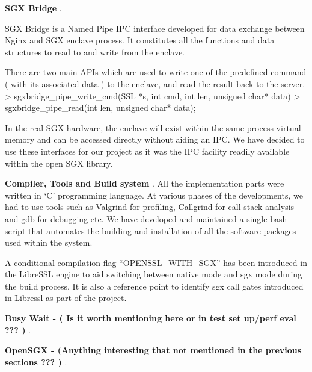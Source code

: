 \documentclass[../main.tex]{subfiles}
\begin{document}
\textbf{SGX Bridge }.

SGX Bridge is a Named Pipe IPC interface developed for data exchange between Nginx and SGX enclave process. It constitutes all the functions and data structures to read to and write from the enclave. 

There are two main APIs which are used to write one of the predefined command ( with its  associated data ) to the enclave, and read the result back to the server. 
> sgxbridge\_pipe\_write\_cmd(SSL *s, int cmd, int len, unsigned char* data)
> sgxbridge\_pipe\_read(int len, unsigned char* data);

In the real SGX hardware, the enclave will exist within the same process virtual memory and can be accessed directly without aiding an IPC. We have decided to use these interfaces for our project as it was the IPC facility readily available within the open SGX library. 

\textbf{Compiler, Tools and Build system }.
All the implementation parts were written in ‘C’ programming language. 
At various phases of the developments, we had to use tools such as Valgrind for profiling, Callgrind for call stack analysis and gdb for debugging etc. We have developed and maintained a single bash script that automates the building and installation of  all the software packages used within the system. 

A conditional compilation flag “OPENSSL\_WITH\_SGX” has been introduced in the LibreSSL engine to aid switching between native mode and sgx mode during the build process. It is also a reference point to identify sgx call gates introduced in Libressl as part of the project.

\textbf{ Busy Wait - ( Is it worth mentioning here or in test set up/perf eval ??? ) }.

\textbf{ OpenSGX - (Anything interesting that not mentioned in the previous sections ??? ) }.
\end{document}
